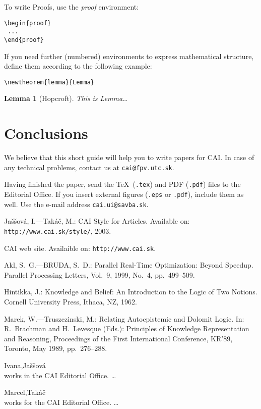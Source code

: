 \documentclass{cai}
\begin{document}
To write Proofs, use the \textit{proof} environment:

\begin{verbatim}
\begin{proof}
 ...
\end{proof}
\end{verbatim}

If you need further (numbered) environments to express mathematical structure, define them according to the
following example:
\newtheorem{lemma}{Lemma}
\begin{verbatim}
\newtheorem{lemma}{Lemma}
\end{verbatim}

\begin{lemma}[Hopcroft]
This is Lemma\dots
\end{lemma}


\section{Conclusions}

We believe that this short guide will help you to write papers for CAI. In case of any technical problems,
contact us at \texttt{cai@fpv.utc.sk}.

Having finished the paper, send the \TeX\ (\texttt{.tex}) and PDF (\texttt{.pdf}) files to the
Editorial Office. If you insert external figures (\texttt{.eps} or \texttt{.pdf}), include them as well. Use the e-mail
address \texttt{cai.ui@savba.sk}.


\begin{thebibliography}{99}
Ja\v{s}\v{s}ov\'a, I.---Tak\'a\v{c}, M.: CAI Style for Articles. Available on:
\texttt{http://www.cai.sk/style/}, 2003.

CAI web site. Availaible on\hbox{:} \texttt{http://www.cai.sk}.

Akl, S.~G.---BRUDA, S.~D.: Parallel Real-Time Optimization: Beyond Speedup. Parallel Processing Letters,
Vol.~9, 1999, No.~4, pp.~499--509.

Hintikka, J.: Knowledge and Belief: An Introduction to the Logic of Two Notions. Cornell University Press,
Ithaca, NZ, 1962.

Marek, W.---Truszczinski, M.: Relating Autoepistemic and Dolomit Logic. In: R.~Brachman and H.~Levesque
(Eds.): Principles of Knowledge Representation and Reasoning, Proceedings of the First International
Conference, KR'89, Toronto, May 1989, pp.~276--288.
\end{thebibliography}


\bio{}Ivana,Ja\v{s}\v{s}ov\'a\\ works in the CAI Editorial Office. \dots

\bio{}Marcel,Tak\'a\v{c}\\ works for the CAI Editorial Office. \dots


\label{lastpage}
\end{document}
